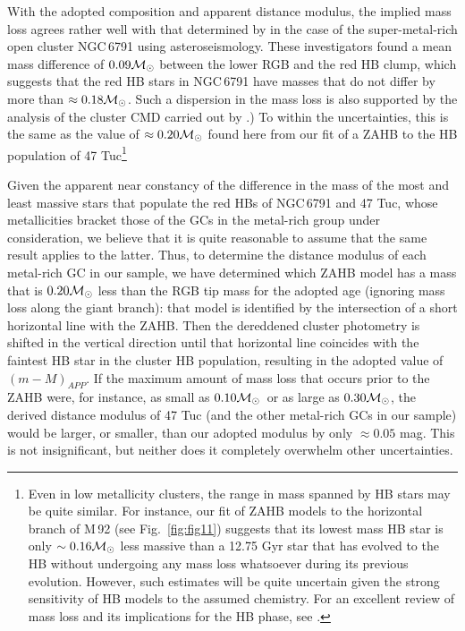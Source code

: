 \documentclass[12pt,preprint]{aastex}
\newcommand\msol{{\cal M_{\odot}}}
\begin{document}
With the adopted composition and apparent distance modulus, the implied mass
loss agrees rather well with that determined by \citet{mbs12} in the case of
the super-metal-rich open cluster NGC$\,$6791 using asteroseismology.  These
investigators found a mean mass difference of $0.09 {{\cal M}_\odot}$ between
the lower RGB and the red HB clump, which suggests that the red HB stars in
NGC$\,$6791 have masses that do not differ by more than $\approx 0.18
{{\cal M}_\odot}$.  Such a dispersion in the mass loss is also supported by
the analysis of the cluster CMD carried out by \citealt{bvb12}.)  To within the
uncertainties, this is the same as the value of $\approx 0.20 {{\cal M}_\odot}$
found here from our fit of a ZAHB to the HB population of
47 Tuc\footnote{Even in low metallicity clusters, the range in mass spanned
by HB stars may be quite similar.  For instance, our fit of ZAHB models to
the horizontal branch of M$\,$92 (see Fig.~\ref{fig:fig11}) suggests that
its lowest mass HB star is only $\sim 0.16 {{\cal M}_\odot}$ less massive than
a 12.75 Gyr star that has evolved to the HB without undergoing any mass loss
whatsoever during its previous evolution.  However, such estimates will be
quite uncertain given the strong sensitivity of HB models to the assumed
chemistry.  For an excellent review of mass loss and its implications for the
HB phase, see \citet{cat09}.}

Given the apparent near constancy of the difference in the mass of the most and
least massive stars that populate the red HBs of NGC$\,$6791 and 47 Tuc, whose
metallicities bracket those of the GCs in the metal-rich group under
consideration, we believe that it is quite reasonable to assume that the same
result applies to the latter.  Thus, to determine the distance modulus of each
metal-rich GC in our sample, we have determined which ZAHB model has a mass
that is $0.20 {{\cal M}_\odot}$ less than the RGB tip mass for the adopted age
(ignoring mass loss along the giant branch): that model is identified by the
intersection of a short horizontal line with the ZAHB.  Then the dereddened
cluster photometry is shifted in the vertical direction until that horizontal
line coincides with the faintest HB star in the cluster HB population, resulting
in the adopted value of $(m-M)_{APP}$.  If the maximum amount of mass loss that
occurs prior to the ZAHB were, for instance, as small as $0.10 \msol$\ or as
large as $0.30 \msol$, the derived distance modulus of 47 Tuc (and the other
metal-rich GCs in our sample) would be larger, or smaller, than our adopted
modulus by only $\approx 0.05$ mag.  This is not insignificant, but neither
does it completely overwhelm other uncertainties.
\end{document}
